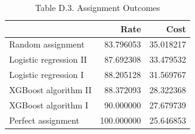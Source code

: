 \begin{table}
\caption{Table D.3. Assignment Outcomes}
\begin{tabular}{lrr}
\toprule
 & Rate & Cost \\
\midrule
Random assignment & 83.796053 & 35.018217 \\
Logistic regression II & 87.692308 & 33.479532 \\
Logistic regression I & 88.205128 & 31.569767 \\
XGBoost algorithm II & 88.372093 & 28.322368 \\
XGBoost algorithm I & 90.000000 & 27.679739 \\
Perfect assignment & 100.000000 & 25.646853 \\
\bottomrule
\end{tabular}
\end{table}
